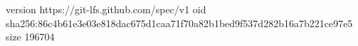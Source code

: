 version https://git-lfs.github.com/spec/v1
oid sha256:86c4b61e3e03e818dac675d1caa71f70a82b1bed9f537d282b16a7b221ce97e5
size 196704
